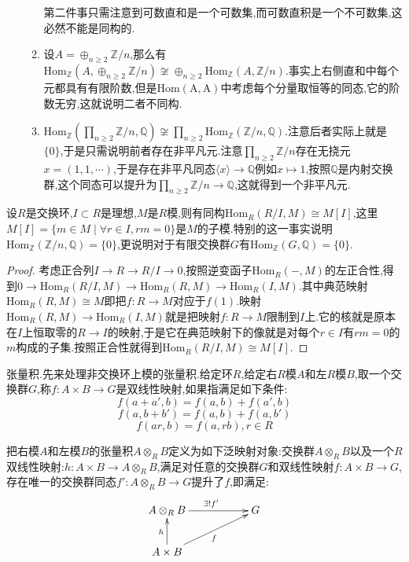 \begin{enumerate}
\begin{enumerate}
    	第二件事只需注意到可数直和是一个可数集,而可数直积是一个不可数集,这必然不能是同构的.
    	\item 设$A=\oplus_{n\ge2}\mathbb{Z}/n$,那么有$\mathrm{Hom}_{\mathbb{Z}}(A,\oplus_{n\ge2}\mathbb{Z}/n)\not\cong\oplus_{n\ge2}\mathrm{Hom}_{\mathbb{Z}}(A,\mathbb{Z}/n)$.事实上右侧直和中每个元都具有有限阶数,但是$\mathrm{Hom(A,A)}$中考虑每个分量取恒等的同态,它的阶数无穷,这就说明二者不同构.
    	\item $\mathrm{Hom}_{\mathbb{Z}}(\prod_{n\ge2}\mathbb{Z}/n,\mathbb{Q})\not\cong\prod_{n\ge2}\mathrm{Hom}_{\mathbb{Z}}(\mathbb{Z}/n,\mathbb{Q})$.注意后者实际上就是$\{0\}$,于是只需说明前者存在非平凡元.注意$\prod_{n\ge2}\mathbb{Z}/n$存在无挠元$x=(1,1,\cdots)$,于是存在非平凡同态$\langle x\rangle\to\mathbb{Q}$例如$x\mapsto1$,按照$\mathbb{Q}$是内射交换群,这个同态可以提升为$\prod_{n\ge2}\mathbb{Z}/n\to\mathbb{Q}$,这就得到一个非平凡元.
    \end{enumerate}
\end{enumerate}

设$R$是交换环,$I\subset R$是理想,$M$是$R$模,则有同构$\mathrm{Hom}_R(R/I,M)\cong M[I]$,这里$M[I]=\{m\in M\mid \forall r\in I,rm=0\}$是$M$的子模.特别的这一事实说明$\mathrm{Hom}_{\mathbb{Z}}(\mathbb{Z}/n,\mathbb{Q})=\{0\}$,更说明对于有限交换群$G$有$\mathrm{Hom}_{\mathbb{Z}}(G,\mathbb{Q})=\{0\}$.
\begin{proof}
	
	考虑正合列$I\to R\to R/I\to0$,按照逆变函子$\mathrm{Hom}_R(-,M)$的左正合性,得到$0\to\mathrm{Hom}_R(R/I,M)\to\mathrm{Hom}_R(R,M)\to\mathrm{Hom}_R(I,M)$.其中典范映射$\mathrm{Hom}_R(R,M)\cong M$即把$f:R\to M$对应于$f(1)$.映射$\mathrm{Hom}_R(R,M)\to\mathrm{Hom}_R(I,M)$就是把映射$f:R\to M$限制到$I$上.它的核就是原本在$I$上恒取零的$R\to I$的映射,于是它在典范映射下的像就是对每个$r\in I$有$rm=0$的$m$构成的子集.按照正合性就得到$\mathrm{Hom}_R(R/I,M)\cong M[I]$.
\end{proof}

张量积.先来处理非交换环上模的张量积.给定环$R$,给定右$R$模$A$和左$R$模$B$,取一个交换群$G$,称$f:A\times B\to G$是双线性映射,如果指满足如下条件:
$$f(a+a',b)=f(a,b)+f(a',b)$$
$$f(a,b+b')=f(a,b)+f(a,b')$$
$$f(ar,b)=f(a,rb),r\in R$$

把右模$A$和左模$B$的张量积$A\otimes_RB$定义为如下泛映射对象:交换群$A\otimes_RB$以及一个$R$双线性映射:$h:A\times B\to A\otimes_RB$,满足对任意的交换群$G$和双线性映射$f:A\times B\to G$,存在唯一的交换群同态$f':A\otimes_RB\to G$提升了$f$,即满足:
$$\xymatrix{
	A\otimes_RB\ar[rr]^{\exists!f'}&&G\\
	A\times B\ar[u]^{h}\ar[urr]_{f}&&
}$$

